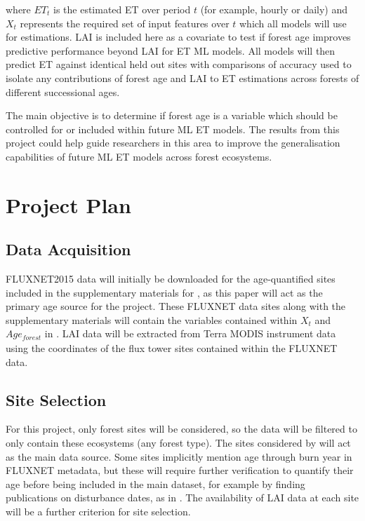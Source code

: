 \documentclass[paper=a4,fontsize=12pt]{scrartcl}
\begin{document}
where $ET_t$ is the estimated ET over period $t$ (for example, hourly or daily) and $X_t$ represents the required set of input features over $t$ which all models will use for estimations. LAI is included here as a covariate to test if forest age improves predictive performance beyond LAI for ET ML models. All models will then predict ET against identical held out sites with comparisons of accuracy used to isolate any contributions of forest age and LAI to ET estimations across forests of different successional ages.
\par The main objective is to determine if forest age is a variable which should be controlled for or included within future ML ET models. The results from this project could help guide researchers in this area to improve the generalisation capabilities of future ML ET models across forest ecosystems.

\newpage
\section{Project Plan} %
\subsection{Data Acquisition}
FLUXNET2015 data will initially be downloaded for the age-quantified sites included in the supplementary materials for \textcite{besnard2018quantifying}, as this paper will act as the primary age source for the project. These FLUXNET data sites along with the supplementary materials will contain the variables contained within $X_t$ and $Age_{\textit{forest}}$ in . LAI data will be extracted from Terra MODIS instrument data \parencite{myneni2015mcd15a3h} using the coordinates of the flux tower sites contained within the FLUXNET data.

\subsection{Site Selection}
For this project, only forest sites will be considered, so the data will be filtered to only contain these ecosystems (any forest type). The sites considered by \textcite{besnard2018quantifying} will act as the main data source. Some sites implicitly mention age through burn year in FLUXNET metadata, but these will require further verification to quantify their age before being included in the main dataset, for example by finding publications on disturbance dates, as in \textcite{besnard2018quantifying}. The availability of LAI data at each site will be a further criterion for site selection.
\end{document}
